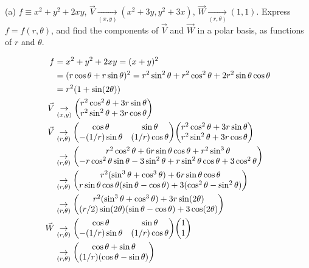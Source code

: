\message{ !name(gr-ch5-notes.tex)}\documentclass[gr-notes.tex]{subfiles}
\begin{document}
(a)
$f \equiv x^2 + y^2 + 2xy$, $\vec{V} \underset{(x,y)}{\to} (x^2 + 3y, y^2 + 3x)$, $\vec{W} \underset{(r,\theta)}{\to} (1, 1)$. Express $f = f(r, \theta)$, and find the components of $\vec{V}$ and $\vec{W}$ in a polar basis, as functions of $r$ and $\theta$.

\begin{align*}
  f &= x^2 + y^2 + 2xy = (x + y)^2
  \\ &=
  (r \cos\theta + r \sin\theta)^2 =
  r^2 \sin^2\theta + r^2 \cos^2\theta + 2 r^2 \sin\theta \cos\theta
  \\ &=
  r^2 (1 + \sin(2 \theta))
  \\
  \vec{V} &\underset{(x,y)}{\to}
  \mqty( r^2 \cos^2\theta + 3 r \sin\theta \\
         r^2 \sin^2\theta + 3 r \cos\theta )
  \\
  \vec{V} &\underset{(r,\theta)}{\to}
  \mqty( \cos\theta & \sin\theta \\
         -(1/r) \sin\theta & (1/r) \cos\theta )
  \mqty( r^2 \cos^2\theta + 3 r \sin\theta \\
         r^2 \sin^2\theta + 3 r \cos\theta )
  \\ &\underset{(r,\theta)}{\to}
  \mqty(
    r^2 \cos^2\theta + 6 r \sin\theta \cos\theta + r^2 \sin^3\theta
    \\
    -r \cos^2\theta \sin\theta - 3 \sin^2\theta +
     r \sin^2\theta \cos\theta + 3 \cos^2\theta
  )
  \\ &\underset{(r,\theta)}{\to}
  \mqty(
    r^2 (\sin^3\theta + \cos^3\theta) + 6 r \sin\theta \cos\theta
    \\
    r \sin\theta \cos\theta (\sin\theta - \cos\theta) +
    3 (\cos^2\theta - \sin^2\theta)
  )
  \\ &\underset{(r,\theta)}{\to}
  \mqty(
    r^2 (\sin^3\theta + \cos^3\theta) + 3 r \sin(2\theta)
    \\
    (r/2) \sin(2\theta) (\sin\theta - \cos\theta) + 3 \cos(2\theta)
  )
  \\
  \vec{W} &\underset{(r,\theta)}{\to}
  \mqty( \cos\theta & \sin\theta \\
         -(1/r) \sin\theta & (1/r) \cos\theta )
  \mqty( 1 \\ 1 )
  \\ &\underset{(r,\theta)}{\to}
  \mqty(
    \cos\theta + \sin\theta
    \\
    (1/r) (\cos\theta - \sin\theta)
  )
\end{align*}
\end{document}

